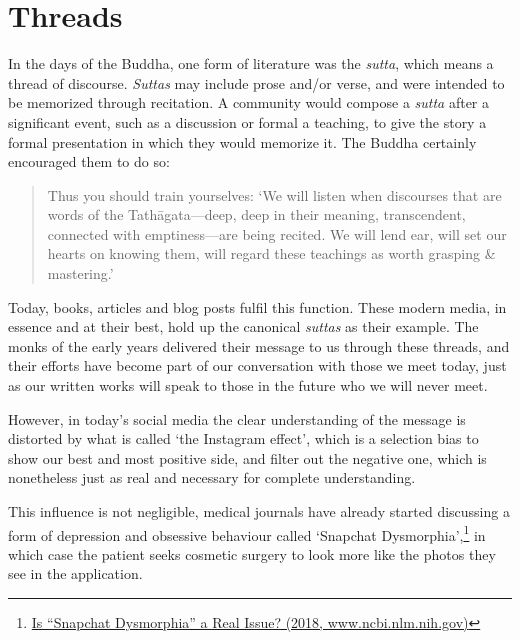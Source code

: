 \clearpage

\section{Threads}


In the days of the Buddha, one form of literature was the \emph{sutta},
which means a thread of discourse. \emph{Suttas} may include prose
and/or verse, and were intended to be memorized through recitation. A
community would compose a \emph{sutta} after a significant event, such
as a discussion or formal a teaching, to give the story a formal
presentation in which they would memorize it. The Buddha certainly
encouraged them to do so:

\begin{quote}
Thus you should train yourselves: `We will listen when discourses that
are words of the Tathāgata---deep, deep in their meaning, transcendent,
connected with emptiness---are being recited. We will lend ear, will set
our hearts on knowing them, will regard these teachings as worth
grasping \& mastering.'

\bigskip

\end{quote}

Today, books, articles and blog posts fulfil this function. These modern
media, in essence and at their best, hold up the canonical \emph{suttas}
as their example. The monks of the early years delivered their message
to us through these threads, and their efforts have become part of our
conversation with those we meet today, just as our written works will
speak to those in the future who we will never meet.


However, in today's social media the clear understanding of the message
is distorted by what is called `the Instagram effect', which is a
selection bias to show our best and most positive side, and filter out
the negative one, which is nonetheless just as real and necessary for
complete understanding.

This influence is not negligible, medical journals have already started
discussing a form of depression and obsessive behaviour called `Snapchat
Dysmorphia',\footnote{\href{https://www.ncbi.nlm.nih.gov/pmc/articles/PMC5933578/}{Is
  ``Snapchat Dysmorphia'' a Real Issue? (2018, www.ncbi.nlm.nih.gov)}}
in which case the patient seeks cosmetic surgery to look more like the
photos they see in the application.

